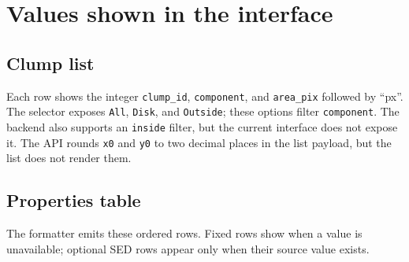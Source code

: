 \documentclass[11pt]{article}
\newcommand{\code}[1]{\texttt{#1}}
\newcommand{\missing}{\textemdash}
\begin{document}
\section{Values shown in the interface}
\subsection{Clump list}
Each row shows the integer \code{clump\_id}, \code{component}, and \code{area\_pix} followed by ``px''. The selector exposes \code{All}, \code{Disk}, and \code{Outside}; these options filter \code{component}. The backend also supports an \code{inside} filter, but the current interface does not expose it. The API rounds \code{x0} and \code{y0} to two decimal places in the list payload, but the list does not render them.
\subsection{Properties table}
The formatter emits these ordered rows. Fixed rows show \missing when a value is unavailable; optional SED rows appear only when their source value exists.
\renewcommand{\arraystretch}{1.15}
\end{document}
